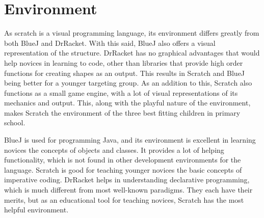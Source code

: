 \section{Environment}
\label{sec:environment}
As scratch is a visual programming language, its environment differs greatly from both BlueJ and DrRacket. With this said, BlueJ also offers a visual representation of the structure. DrRacket has no graphical advantages that would help novices in learning to code, other than libraries that provide high order functions for creating shapes as an output. This results in Scratch and BlueJ being better for a younger targeting group. As an addition to this, Scratch also functions as a small game engine, with a lot of visual representations of its mechanics and output. This, along with the playful nature of the environment, makes Scratch the environment of the three best fitting children in primary school.

BlueJ is used for programming Java, and its environment is excellent in learning novices the concepts of objects and classes. It provides a lot of helping functionality, which is not found in other development environments for the language. Scratch is good for teaching younger novices the basic concepts of imperative coding. DrRacket helps in understanding declarative programming, which is much different from most well-known paradigms. They each have their merits, but as an educational tool for teaching novices, Scratch has the most helpful environment.